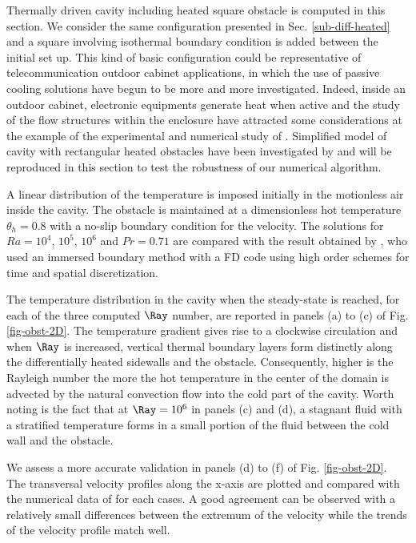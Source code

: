 Thermally driven cavity including heated square obstacle is computed in this section.
We consider the same configuration presented in Sec. \ref{sub-diff-heated} and a square involving isothermal boundary condition is added between the initial set up.
This kind of basic configuration could be representative of telecommunication outdoor cabinet applications, in which the use of passive cooling solutions have begun to be more and more investigated.
Indeed, inside an outdoor cabinet, electronic equipments generate heat when active and the study of the flow structures within the enclosure have attracted some considerations at the example of the experimental and numerical study of \cite{Raluca2013}.
Simplified model of cavity with rectangular heated obstacles have been investigated by \cite{Raluca2013} and will be reproduced in this section to test the robustness of our numerical algorithm.

A linear distribution of the temperature is imposed initially in the motionless air inside the cavity.
The obstacle is maintained at a dimensionless hot temperature $\theta_h = 0.8$ with a no-slip boundary condition for the velocity.
The solutions for $Ra = 10^4$, $10^5$, $10^6$ and $Pr = 0.71$ are compared with the result obtained by \cite{Raluca2013}, who used an immersed boundary method with a FD code using high order schemes for time and spatial discretization.

The temperature distribution in the cavity when the steady-state is reached, for each of the three computed $\Ray$ number, are reported in panels (a) to (c) of Fig. \ref{fig-obst-2D}.
The temperature gradient gives rise to a clockwise circulation and when $\Ray$ is increased, vertical thermal boundary layers form distinctly along the differentially heated sidewalls and the obstacle.
Consequently, 
higher is the Rayleigh number the more the hot temperature in the center of the domain is advected by the natural convection flow into the cold part of the cavity. 
Worth noting is the fact that at $\Ray = 10^6$ in panels (c) and (d), a stagnant fluid with a stratified temperature forms in a small portion of the fluid between the cold wall and the obstacle.

We assess a more accurate validation in panels (d) to (f) of Fig. \ref{fig-obst-2D}.
The transversal velocity profiles along the x-axis are plotted and compared with the numerical data of \cite{Raluca2013} for each cases. 
A good agreement can be observed with a relatively small differences between the extremum of the velocity while the trends of the velocity profile match well.

